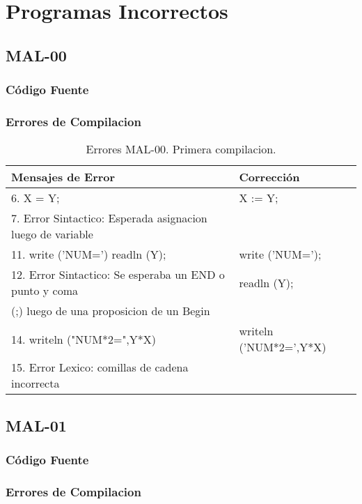 \documentclass[a4paper,12pt]{article}
\begin{document}
\section{Programas Incorrectos}
\subsection{MAL-00}
\subsubsection{Código Fuente}

\subsubsection{Errores de Compilacion}

\begin{table}[h!]
\centering
\begin{tabular}{|l|l|}
\hline
Mensajes de Error & Corrección\\
\hline
6. X = Y; 													&  X := Y;\\
7. Error Sintactico: Esperada asignacion luego de variable	& \\
\hline
11. write ('NUM=') readln (Y);								& write ('NUM=');\\ 
12. Error Sintactico: Se esperaba un END o punto y coma 		& readln (Y);\\
(;) luego de una proposicion de un Begin						&\\
\hline
14. writeln ("NUM*2=",Y*X)									& writeln ('NUM*2=',Y*X)\\
15. Error Lexico: comillas de cadena incorrecta				& \\
\hline
\end{tabular}
\caption{Errores MAL-00. Primera compilacion.}
\label{MAL-00-1}
\end{table}

\subsection{MAL-01}
\subsubsection{Código Fuente}

\subsubsection{Errores de Compilacion}
\end{document}
